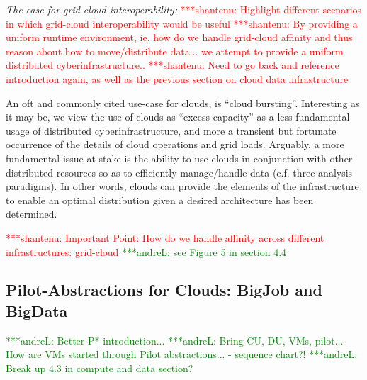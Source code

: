 \documentclass[times]{cpeauth}
\newcommand{\jhanote}[1]{ {\textcolor{red} { ***shantenu: #1 }}}
\newcommand{\alnote}[1]{ {\textcolor{green} { ***andreL: #1 }}}
\newcommand{\alnote}[1]{}
\newcommand{\jhanote}[1]{}
\begin{document}

{\it The case for grid-cloud interoperability:} \jhanote{Highlight
  different scenarios in which grid-cloud interoperability would be
  useful} \jhanote{By providing a uniform runtime environment, ie.
  how do we handle grid-cloud affinity and thus reason about how to
  move/distribute data... we attempt to provide a uniform distributed
  cyberinfrastructure..} \jhanote{Need to go back and reference
  introduction again, as well as the previous section on cloud data
  infrastructure}

An oft and commonly cited use-case for clouds, is ``cloud bursting''.
Interesting as it may be, we view the use of clouds as ``excess
capacity'' as a less fundamental usage of distributed
cyberinfrastructure, and more a transient but fortunate occurrence of
the details of cloud operations and grid loads. Arguably, a more
fundamental issue at stake is the ability to use clouds in conjunction
with other distributed resources so as to efficiently manage/handle
data (c.f. three analysis paradigms).  In other words, clouds can
provide the elements of the infrastructure to enable an optimal
distribution given a desired architecture has been determined.

\jhanote{Important Point: How do we handle affinity across different
  infrastructures: grid-cloud} \alnote{see Figure 5 in section 4.4}





\subsection{Pilot-Abstractions for Clouds: BigJob and BigData}

\alnote{Better P* introduction...}
\alnote{Bring CU, DU, VMs, pilot... How are VMs started through Pilot 
abstractions... - sequence chart?!}
\alnote{Break up 4.3 in compute and data section?}
\end{document}
